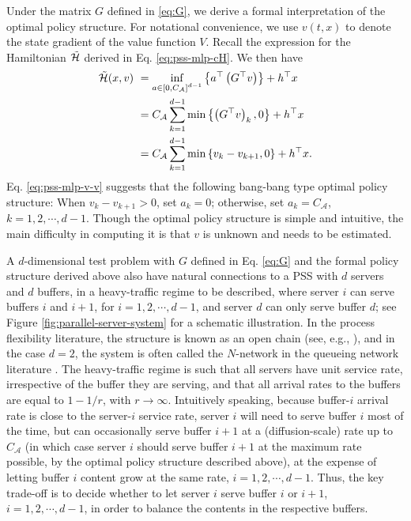 \documentclass[11pt]{article}
\theoremstyle{definition}
\theoremstyle{plain}
\newcommand{\cH}{{\cal H}}
\begin{document}
Under the matrix $G$ defined in \eqref{eq:G}, we derive a formal interpretation of the optimal policy structure. 
For notational convenience, we use $v(t,x)$ to denote the state gradient of the value function $V$. 
Recall the expression for the Hamiltonian $\tilde \cH$ 
derived in Eq. \eqref{eq:pss-mlp-cH}. We then have 
\begin{align}
  \tilde \cH (x, v) &~= \inf_{a \in \left[0, C_{\mathcal{A}}\right]^{d-1}} \left\{a^\top \left(G^\top v\right) \right\} + h^\top x \nonumber \\
  &~= C_{\mathcal{A}} \sum_{k=1}^{d-1} \min\left\{\left(G^\top v\right)_k, 0\right\} + h^\top x \nonumber \\
  &~= C_{\mathcal{A}} \sum_{k=1}^{d-1} \min\left\{v_k-v_{k+1}, 0\right\} + h^\top x. \label{eq:pss-mlp-v-v}
\end{align}
Eq. \eqref{eq:pss-mlp-v-v} suggests that the following bang-bang type optimal policy structure: 
When $v_k-v_{k+1} > 0$, set $a_k = 0$; otherwise, set $a_k = C_{\mathcal{A}}$, $k=1, 2, \cdots, d-1$. 
Though the optimal policy structure is simple and intuitive, the main difficulty in computing it is that $v$ is unknown and needs to be estimated. 

A $d$-dimensional test problem with $G$ defined in Eq. \eqref{eq:G} and the formal policy structure derived above 
also have natural connections to a PSS 
with $d$ servers and $d$ buffers, in a heavy-traffic regime to be described, where server $i$ can serve buffers $i$ and $i+1$, for $i = 1, 2, \cdots, d-1$, 
and server $d$ can only serve buffer $d$; see Figure \ref{fig:parallel-server-system} for a schematic illustration. 
In the process flexibility literature, the structure is known as an open chain (see, e.g., \cite{WangWangZhang2021}), and 
in the case $d=2$, the system is often called the $N$-network in the queueing network literature \cite{Harrison1998,BellWilliams2001,TezcanDai2010,GhamamiWard2013}. 
The heavy-traffic regime is such that all servers have unit service rate, irrespective of the buffer they are serving, and 
that all arrival rates to the buffers are equal to $1-1/r$, with $r \to \infty$. 
Intuitively speaking, because buffer-$i$ arrival rate is close to the server-$i$ service rate,  
server $i$ will need to serve buffer $i$ most of the time, 
but can occasionally serve buffer $i+1$ at a (diffusion-scale) rate up to $C_{\mathcal{A}}$
(in which case server $i$ should serve buffer $i+1$ at the maximum rate possible, by the optimal policy structure described above), 
at the expense of letting buffer $i$ content 
grow at the same rate, $i=1, 2, \cdots, d-1$. Thus, the key trade-off is to decide whether to let server $i$ serve buffer $i$ or $i+1$, $i=1, 2, \cdots, d-1$, 
in order to balance the contents in the respective buffers. 
\end{document}
